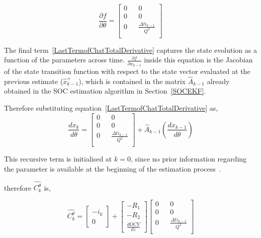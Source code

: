 \begin{equation}
    \frac{\partial f}{\partial \theta} = 
    \begin{bmatrix}
        0 && 0 \\
        0 && 0 \\
        0 && \frac{\Delta t i_{k-1}}{Q^2} \\
    \end{bmatrix}
\end{equation}

The final term~\ref{LastTermofChatTotalDerivative} captures the state evolution as a function of the parameters across time.
$\frac{\partial f}{\partial x_{k-1}}$ inside this equation is the Jacobian of the state transition function with respect to the
state vector evaluated at the previous estimate ($\hat{x}_{k-1}^+$), which is contained in the matrix $\hat{A}_{k-1}$ already obtained
in the \acs{SOC} estimation algorithm in Section~\ref{SOCEKF}.

Therefore substituting equation~\ref{LastTermofChatTotalDerivative} as,
\begin{equation}
    \frac{d x_k}{d\theta} = 
    \begin{bmatrix}
        0 && 0 \\
        0 && 0 \\
        0 && \frac{\Delta t i_{k-1}}{Q^2} \\
    \end{bmatrix} 
    + \hat{A}_{k-1}(\frac{d x_{k-1}}{d\theta})
    \label{LastTermofChatTotalDerivativewithAmatrix}
\end{equation}

This recursive term is initialised at $k=0$, since no prior information regarding the parameter is available at the beginning 
of the estimation process~\cite{plett2015battery}.

therefore $\hat{C_k^\theta}$ is,

\begin{equation}
    \hat{C_k^\theta} = 
    \begin{bmatrix}
        - i_k \\
        0
    \end{bmatrix} + 
    \begin{bmatrix}
        - R_1 \\
        - R_2 \\
        \frac{dOCV}{dz}
    \end{bmatrix}
    \begin{bmatrix}
        0 && 0 \\
        0 && 0 \\
        0 && \frac{\Delta t i_{k-1}}{Q^2} \\
    \end{bmatrix}
\end{equation}

